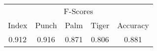\documentclass{standalone}
\begin{document}
 
 \begin{tabular}{|c|c|c|c ||c|}
\cline{1-5}\multicolumn{5}{|c|}{F-Scores} \\ 
\cline{1-5}Index & Punch & Palm & Tiger & Accuracy\\ 
\cline{1-5}0.912 & 0.916 & 0.871 & 0.806 & 0.881\\ 
 \cline{1-5}\hline \end{tabular}
 
\end{document}
